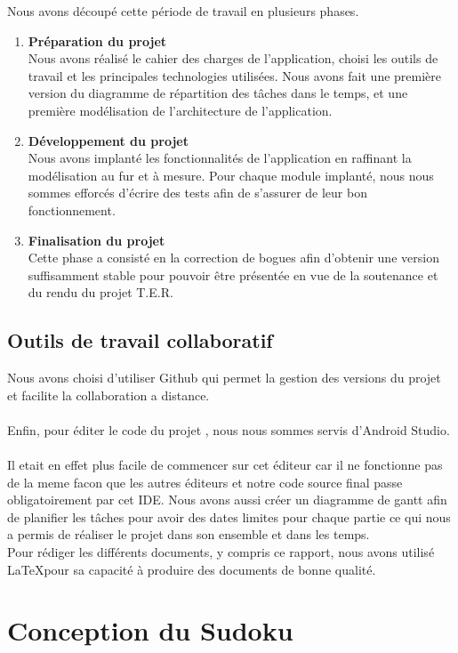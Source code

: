 \documentclass{article}
\begin{document}
Nous avons découpé cette période de travail en plusieurs phases.
\begin{enumerate}
    \item \textbf{Préparation du projet}\\
          Nous avons réalisé le cahier des charges de l’application, choisi les
          outils de travail et les principales technologies utilisées. Nous avons fait une première version
          du diagramme de répartition des tâches dans le temps, et une première modélisation de
          l’architecture de l’application.
\item \textbf{Développement du projet}\\
Nous avons implanté les fonctionnalités de l’application en
raffinant la modélisation au fur et à mesure. Pour chaque module implanté, nous nous sommes
efforcés d’écrire des tests afin de s’assurer de leur bon fonctionnement.
\item \textbf{Finalisation du projet}\\
Cette phase a consisté en la correction de bogues afin d’obtenir une
version suffisamment stable pour pouvoir être présentée en vue de la soutenance et du rendu
du projet T.E.R.
\end{enumerate}
\newpage

\subsection{Outils de travail collaboratif }
Nous avons choisi d’utiliser Github qui  permet la gestion des versions du projet et facilite la collaboration a distance.\\\\
Enfin, pour éditer le code du projet , nous nous sommes servis d'Android Studio.\\\\
Il etait en effet plus facile de commencer sur cet éditeur car il ne fonctionne pas de la meme facon que les autres éditeurs et notre code source final passe obligatoirement par cet IDE.
Nous avons aussi créer un diagramme de gantt afin de planifier les tâches pour avoir des dates limites pour chaque partie ce qui nous a permis de réaliser le projet dans son ensemble et dans les temps.\\
\newline Pour rédiger les différents documents, y compris ce rapport, nous
avons utilisé \LaTeX  pour sa capacité à produire des documents de bonne qualité.

\newpage
\section{Conception du Sudoku}
\end{document}
